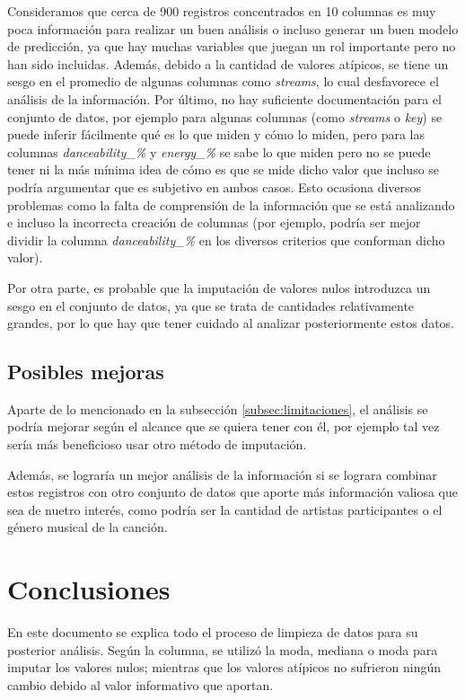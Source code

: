 \documentclass{article}
\begin{document}
	Consideramos que cerca de 900 registros concentrados en 10 columnas es muy poca información para realizar un buen análisis o incluso generar un buen modelo de predicción, ya que hay muchas variables que juegan un rol importante pero no han sido incluidas. Además, debido a la cantidad de valores atípicos, se tiene un sesgo en el promedio de algunas columnas como \textit{streams}, lo cual desfavorece el análisis de la información. Por último, no hay suficiente documentación para el conjunto de datos, por ejemplo para algunas columnas (como \textit{streams} o \textit{key}) se puede inferir fácilmente qué es lo que miden y cómo lo miden, pero para las columnas \textit{danceability\_\%} y \textit{energy\_\%} se sabe lo que miden pero no se puede tener ni la más mínima idea de cómo es que se mide dicho valor que incluso se podría argumentar que es subjetivo en ambos casos. Esto ocasiona diversos problemas como la falta de comprensión de la información que se está analizando e incluso la incorrecta creación de columnas (por ejemplo, podría ser mejor dividir la columna \textit{danceability\_\%} en los diversos criterios que conforman dicho valor).
	
	Por otra parte, es probable que la imputación de valores nulos introduzca un sesgo en el conjunto de datos, ya que se trata de cantidades relativamente grandes, por lo que hay que tener cuidado al analizar posteriormente estos datos.
	
	\subsection{Posibles mejoras}
	Aparte de lo mencionado en la subsección \ref{subsec:limitaciones}, el análisis se podría mejorar según el alcance que se quiera tener con él, por ejemplo tal vez sería más beneficioso usar otro método de imputación.
	
	Además, se lograría un mejor análisis de la información si se lograra combinar estos registros con otro conjunto de datos que aporte más información valiosa que sea de nuetro interés, como podría ser la cantidad de artistas participantes o el género musical de la canción.
	
	\section{Conclusiones}
	En este documento se explica todo el proceso de limpieza de datos para su posterior análisis. Según la columna, se utilizó la moda, mediana o moda para imputar los valores nulos; mientras que los valores atípicos no sufrieron ningún cambio debido al valor informativo que aportan.
	
\end{document}
